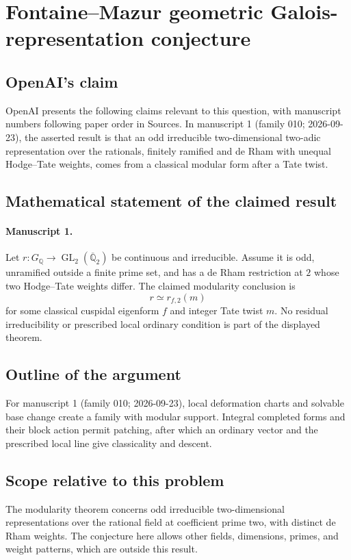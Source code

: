 \documentclass[11pt]{article}
\begin{document}
\section*{Fontaine–Mazur geometric Galois-representation conjecture}

\subsection{OpenAI's claim}
OpenAI presents the following claims relevant to this question, with manuscript numbers following paper order in Sources. In manuscript 1 (family 010; 2026-09-23), the asserted result is that an odd irreducible two-dimensional two-adic representation over the rationals, finitely ramified and de Rham with unequal Hodge--Tate weights, comes from a classical modular form after a Tate twist.

\subsection{Mathematical statement of the claimed result}
\paragraph{Manuscript 1.}
Let $r:G_{\mathbb Q}\to\operatorname{GL}_2(\overline{\mathbb Q}_2)$ be continuous and irreducible. Assume it is odd, unramified outside a finite prime set, and has a de Rham restriction at $2$ whose two Hodge--Tate weights differ. The claimed modularity conclusion is
\[
 r\simeq r_{f,2}(m)
\]
for some classical cuspidal eigenform $f$ and integer Tate twist $m$. No residual irreducibility or prescribed local ordinary condition is part of the displayed theorem.

\subsection{Outline of the argument}
For manuscript 1 (family 010; 2026-09-23), local deformation charts and solvable base change create a family with modular support. Integral completed forms and their block action permit patching, after which an ordinary vector and the prescribed local line give classicality and descent.

\subsection{Scope relative to this problem}
The modularity theorem concerns odd irreducible two-dimensional representations over the rational field at coefficient prime two, with distinct de Rham weights. The conjecture here allows other fields, dimensions, primes, and weight patterns, which are outside this result.
\end{document}
